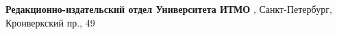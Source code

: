 { %
	\vspace*{\fill} %
	\large\noindent\textbf {Редакционно-издательский отдел
		\newline Университета ИТМО
	}
	, Санкт-Петербург, Кронверкский пр., 49
}
